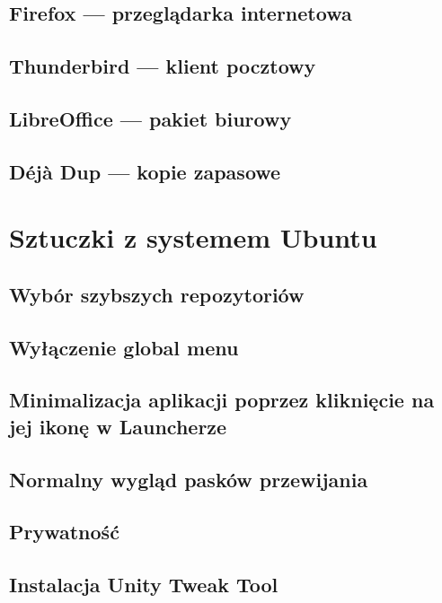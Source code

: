 \documentclass[a4paper,11pt,oneside]{mwart}
\begin{document}
		\subsection{Firefox --- przeglądarka internetowa}
			
		\subsection{Thunderbird --- klient pocztowy}
			
		\subsection{LibreOffice --- pakiet biurowy}
			 
		\subsection{Déjà Dup --- kopie zapasowe}
			
	\section{Sztuczki z systemem Ubuntu}
		
		\subsection{Wybór szybszych repozytoriów}
			
		\subsection{Wyłączenie global menu}
			
		\subsection{Minimalizacja aplikacji poprzez kliknięcie na jej ikonę w Launcherze}
			
		\subsection{Normalny wygląd pasków przewijania}
			
		\subsection{Prywatność}
			
		\subsection{Instalacja Unity Tweak Tool}
			
\end{document}
